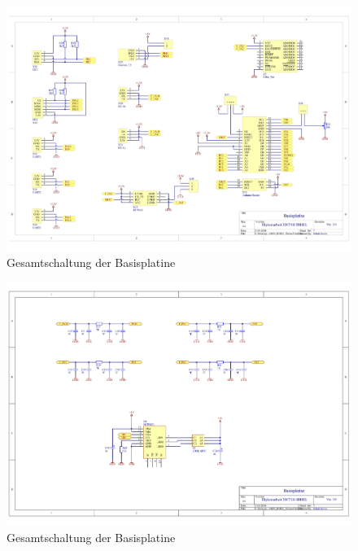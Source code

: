 \begin{figure}[H]\ContinuedFloat
    \centering
    \includegraphics[width=1.25\textwidth,angle=90]{Schuh/Pictures/Basis2-Schaltung5}
    \caption[Gesamtschaltung der Basisplatine]{Gesamtschaltung der \gls{Basisplatine}}
\end{figure}
\begin{figure}[H]\ContinuedFloat
    \centering
    \includegraphics[width=1.25\textwidth,angle=90]{Schuh/Pictures/Basis2-Schaltung6}
    \caption[Gesamtschaltung der Basisplatine]{Gesamtschaltung der \gls{Basisplatine}}
\end{figure}
